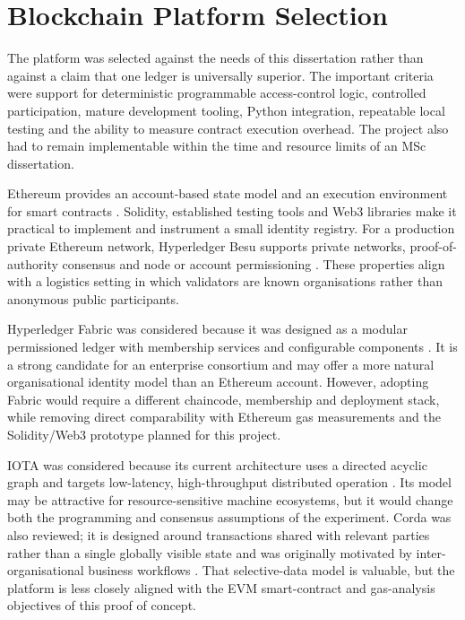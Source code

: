\section{Blockchain Platform Selection}
\label{sec:blockchain-platform-selection}

The platform was selected against the needs of this dissertation rather than against a claim that one ledger is universally superior. The important criteria were support for deterministic programmable access-control logic, controlled participation, mature development tooling, Python integration, repeatable local testing and the ability to measure contract execution overhead. The project also had to remain implementable within the time and resource limits of an MSc dissertation.

Ethereum provides an account-based state model and an execution environment for smart contracts \cite{Wood2025Ethereum}. Solidity, established testing tools and Web3 libraries make it practical to implement and instrument a small identity registry. For a production private Ethereum network, Hyperledger Besu supports private networks, proof-of-authority consensus and node or account permissioning \cite{BesuPrivateNetworks2026,BesuPermissioning2026}. These properties align with a logistics setting in which validators are known organisations rather than anonymous public participants.

Hyperledger Fabric was considered because it was designed as a modular permissioned ledger with membership services and configurable components \cite{Androulaki2018Fabric}. It is a strong candidate for an enterprise consortium and may offer a more natural organisational identity model than an Ethereum account. However, adopting Fabric would require a different chaincode, membership and deployment stack, while removing direct comparability with Ethereum gas measurements and the Solidity/Web3 prototype planned for this project.

IOTA was considered because its current architecture uses a directed acyclic graph and targets low-latency, high-throughput distributed operation \cite{IOTAConsensus2026}. Its model may be attractive for resource-sensitive machine ecosystems, but it would change both the programming and consensus assumptions of the experiment. Corda was also reviewed; it is designed around transactions shared with relevant parties rather than a single globally visible state and was originally motivated by inter-organisational business workflows \cite{Brown2018Corda}. That selective-data model is valuable, but the platform is less closely aligned with the EVM smart-contract and gas-analysis objectives of this proof of concept.

